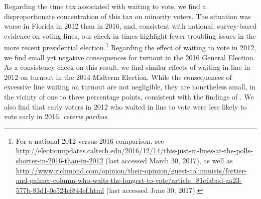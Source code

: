 \documentclass[12pt,titlepage]{article}
\begin{document}



Regarding the time tax associated with waiting to vote, we find a
disproportionate concentration of this tax on minority voters. The
situation was worse in Florida in 2012 than in 2016, and, consistent
with national, survey-based evidence on voting lines, our check-in
times highlight fewer troubling issues in the more recent presidential
election.\footnote{For a national 2012 versus 2016
  comparison, see
  \url{http://electionupdates.caltech.edu/2016/12/14/this-just-in-lines-at-the-polls-shorter-in-2016-than-in-2012}
  (last accessed March 30, 2017), as well as
  \url{http://www.richmond.com/opinion/their-opinion/guest-columnists/fortier-and-palmer-column-who-waits-the-longest-to-vote/article_81efabad-aa23-577b-83d1-0e524cf844ef.html}
  (last accessed June 30, 2017).} Regarding the effect of waiting to
vote in 2012, we find small yet negative consequences for turnout in
the 2016 General Election. As a consistency check on this result, we
find similar effects of waiting in line in 2012 on turnout in the 2014
Midterm Election. While the consequences of excessive line waiting on
turnout are not negligible, they are nonetheless small, in the vicinty
of one to three percentage points, consistent with the findings of
\citet{pettigrew:longlinesminorityprecincts}. We also find that early
voters in 2012 who waited in line to vote were less likely to vote
early in 2016, \emph{ceteris paribus}.
\end{document}
